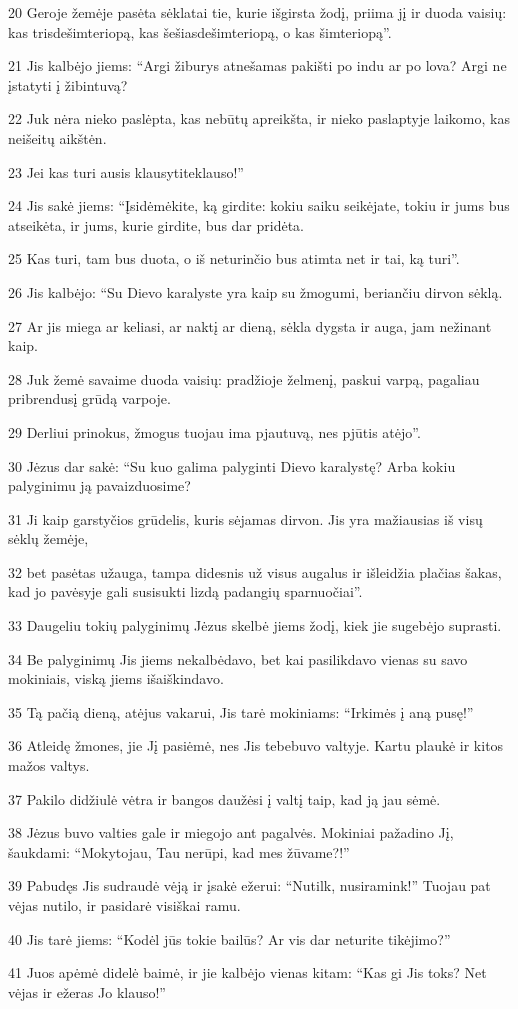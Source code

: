 \par 20 Geroje žemėje pasėta sėkla­tai tie, kurie išgirsta žodį, priima jį ir duoda vaisių: kas trisdešimteriopą, kas šešiasdešimteriopą, o kas šimteriopą”. 
\par 21 Jis kalbėjo jiems: “Argi žiburys atnešamas pakišti po indu ar po lova? Argi ne įstatyti į žibintuvą? 
\par 22 Juk nėra nieko paslėpta, kas nebūtų apreikšta, ir nieko paslaptyje laikomo, kas neišeitų aikštėn. 
\par 23 Jei kas turi ausis klausyti­teklauso!” 
\par 24 Jis sakė jiems: “Įsidėmėkite, ką girdite: kokiu saiku seikėjate, tokiu ir jums bus atseikėta, ir jums, kurie girdite, bus dar pridėta. 
\par 25 Kas turi, tam bus duota, o iš neturinčio bus atimta net ir tai, ką turi”. 
\par 26 Jis kalbėjo: “Su Dievo karalyste yra kaip su žmogumi, beriančiu dirvon sėklą. 
\par 27 Ar jis miega ar keliasi, ar naktį ar dieną, sėkla dygsta ir auga, jam nežinant kaip. 
\par 28 Juk žemė savaime duoda vaisių: pradžioje želmenį, paskui varpą, pagaliau pribrendusį grūdą varpoje. 
\par 29 Derliui prinokus, žmogus tuojau ima pjautuvą, nes pjūtis atėjo”. 
\par 30 Jėzus dar sakė: “Su kuo galima palyginti Dievo karalystę? Arba kokiu palyginimu ją pavaizduosime? 
\par 31 Ji kaip garstyčios grūdelis, kuris sėjamas dirvon. Jis yra mažiausias iš visų sėklų žemėje, 
\par 32 bet pasėtas užauga, tampa didesnis už visus augalus ir išleidžia plačias šakas, kad jo pavėsyje gali susisukti lizdą padangių sparnuočiai”. 
\par 33 Daugeliu tokių palyginimų Jėzus skelbė jiems žodį, kiek jie sugebėjo suprasti. 
\par 34 Be palyginimų Jis jiems nekalbėdavo, bet kai pasilikdavo vienas su savo mokiniais, viską jiems išaiškindavo. 
\par 35 Tą pačią dieną, atėjus vakarui, Jis tarė mokiniams: “Irkimės į aną pusę!” 
\par 36 Atleidę žmones, jie Jį pasiėmė, nes Jis tebebuvo valtyje. Kartu plaukė ir kitos mažos valtys. 
\par 37 Pakilo didžiulė vėtra ir bangos daužėsi į valtį taip, kad ją jau sėmė. 
\par 38 Jėzus buvo valties gale ir miegojo ant pagalvės. Mokiniai pažadino Jį, šaukdami: “Mokytojau, Tau nerūpi, kad mes žūvame?!” 
\par 39 Pabudęs Jis sudraudė vėją ir įsakė ežerui: “Nutilk, nusiramink!” Tuojau pat vėjas nutilo, ir pasidarė visiškai ramu. 
\par 40 Jis tarė jiems: “Kodėl jūs tokie bailūs? Ar vis dar neturite tikėjimo?” 
\par 41 Juos apėmė didelė baimė, ir jie kalbėjo vienas kitam: “Kas gi Jis toks? Net vėjas ir ežeras Jo klauso!”



